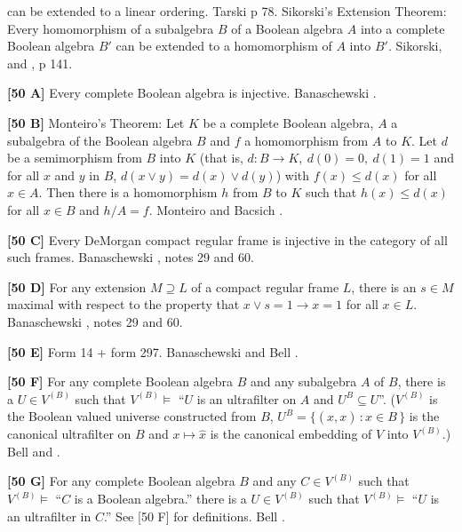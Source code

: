 can be extended to a linear ordering.  \ac{Tarski} \cite{1924} p 78.
\medskip
{}  Sikorski's  Extension Theorem: Every homomorphism
of a subalgebra $B$ of a Boolean algebra $A$ into a complete Boolean
algebra $B'$ can be extended to a homomorphism of $A$ into $B'$.
\ac{Sikorski}\cite{1950}, \cite{1960} and \cite{1964}, p 141.
\smallskip
\item{}{\bf [50 A]}  Every complete Boolean algebra is injective.
\ac{Banaschewski} \cite{1988}.
\smallskip
\item{}{\bf [50 B]}  Monteiro's Theorem:  Let $K$ be a complete Boolean
algebra, $A$ a subalgebra of the Boolean algebra $B$ and $f$ a
homomorphism from $A$ to $K$. Let $d$ be a semimorphism from $B$ into
$K$ (that is, $d: B\to K,\ d(0)=0,\ d(1)=1$ and for all $x$ and $y$ in
$B$, $d(x\lor y)=d(x)\lor d(y)$) with $f(x)\le d(x)$ for all $x\in A$.
Then there is a homomorphism $h$ from $B$ to $K$ such that $h(x)\le d(x)$
for all $x \in B$ and $h/A = f$.  \ac{Monteiro} \cite{1965} and \ac{Bacsich}
\cite{1972a}.  
\smallskip
\item{}{\bf [50 C]} Every DeMorgan compact regular frame is injective in
the category of all such frames.  \ac{Banaschewski} \cite{1988}, notes 29
and 60.
\smallskip
\item{}{\bf [50 D]} For any extension $M \supseteq L$ of a compact regular
frame $L$, there is an $s\in M$ maximal with respect to the property that
$x\lor s =1 \to x=1$ for all $x\in L$.  \ac{Banaschewski} \cite{1988},
notes 29 and 60.
\smallskip
\item{}{\bf [50 E]}  Form 14 + form 297. \ac{Banaschewski} \cite{1988} and
\ac{Bell} \cite{1988}.
\smallskip
\item{}{\bf [50 F]} For any complete Boolean algebra $B$ and any subalgebra
$A$ of $B$, there is a $U \in V^{(B)}$ such that $V^{(B)}\models$
``$U$ is an ultrafilter on $A$ and $U^B \subseteq U$''.  ($V^{(B)}$ is
the Boolean valued universe constructed from $B$, $U^B = \{ (\hat x,x)
\, : x\in B\,\}$ is the canonical ultrafilter on $B$ and $x\mapsto\hat x$
is the canonical embedding of $V$ into $V^{(B)}$.)  \ac{Bell} \cite{1977}
and \cite{1983}.
\smallskip
\item{}{\bf [50 G]}  For any complete Boolean algebra $B$ and
any $C\in V^{(B)}$ such that $V^{(B)}\models$ ``$C$ is a Boolean algebra.''
there is a $U\in V^{(B)}$ such that $V^{(B)}\models $ ``$U$ is an
ultrafilter in $C$.''  See [50 F] for definitions.  \ac{Bell} \cite{1983}.
